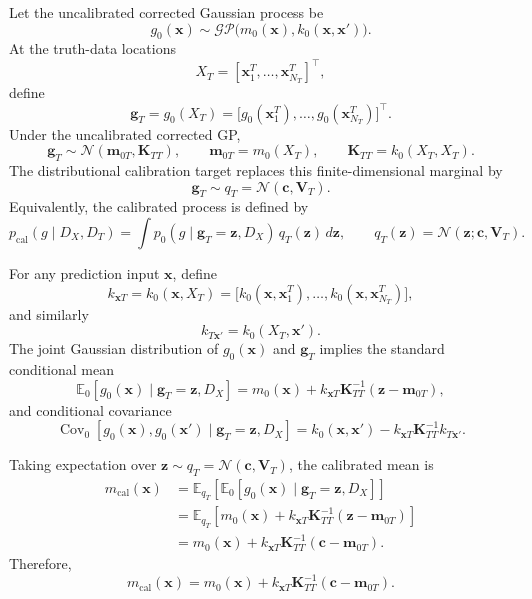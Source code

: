 \documentclass[a4paper,12pt]{article}
\begin{document}
\begin{appendix}
Let the uncalibrated corrected Gaussian process be
\[
g_0(\mathbf{x}) \sim \mathcal{GP}\bigl(m_0(\mathbf{x}),k_0(\mathbf{x},\mathbf{x}')\bigr).
\]
At the truth-data locations
\[
X_T = [\mathbf{x}_1^T,\ldots,\mathbf{x}_{N_T}^T]^\top,
\]
define
\[
\mathbf{g}_T
=
g_0(X_T)
=
\bigl[g_0(\mathbf{x}_1^T),\ldots,g_0(\mathbf{x}_{N_T}^T)\bigr]^\top .
\]
Under the uncalibrated corrected GP,
\[
\mathbf{g}_T \sim \mathcal{N}(\mathbf{m}_{0T},\mathbf{K}_{TT}),
\qquad
\mathbf{m}_{0T}=m_0(X_T),
\qquad
\mathbf{K}_{TT}=k_0(X_T,X_T).
\]
The distributional calibration target replaces this finite-dimensional marginal by
\[
\mathbf{g}_T \sim q_T
=
\mathcal{N}(\mathbf{c},\mathbf{V}_T).
\]
Equivalently, the calibrated process is defined by
\[
p_{\mathrm{cal}}(g\mid D_X,D_T)
=
\int
p_0(g\mid \mathbf{g}_T=\mathbf{z},D_X)\,
q_T(\mathbf{z})\,d\mathbf{z},
\qquad
q_T(\mathbf{z})=\mathcal{N}(\mathbf{z};\mathbf{c},\mathbf{V}_T).
\]

For any prediction input \(\mathbf{x}\), define
\[
k_{\mathbf{x}T}
=
k_0(\mathbf{x},X_T)
=
\bigl[
k_0(\mathbf{x},\mathbf{x}_1^T),
\ldots,
k_0(\mathbf{x},\mathbf{x}_{N_T}^T)
\bigr],
\]
and similarly
\[
k_{T\mathbf{x}'}
=
k_0(X_T,\mathbf{x}').
\]
The joint Gaussian distribution of \(g_0(\mathbf{x})\) and \(\mathbf{g}_T\) implies the
standard conditional mean
\[
\mathbb{E}_0
\left[
g_0(\mathbf{x})
\mid
\mathbf{g}_T=\mathbf{z},D_X
\right]
=
m_0(\mathbf{x})
+
k_{\mathbf{x}T}\mathbf{K}_{TT}^{-1}
(\mathbf{z}-\mathbf{m}_{0T}),
\]
and conditional covariance
\[
\operatorname{Cov}_0
\left[
g_0(\mathbf{x}),g_0(\mathbf{x}')
\mid
\mathbf{g}_T=\mathbf{z},D_X
\right]
=
k_0(\mathbf{x},\mathbf{x}')
-
k_{\mathbf{x}T}\mathbf{K}_{TT}^{-1}k_{T\mathbf{x}'}.
\]

Taking expectation over
\(\mathbf{z}\sim q_T=\mathcal{N}(\mathbf{c},\mathbf{V}_T)\), the calibrated mean is
\[
\begin{aligned}
m_{\mathrm{cal}}(\mathbf{x})
&=
\mathbb{E}_{q_T}
\left[
\mathbb{E}_0
\left[
g_0(\mathbf{x})
\mid
\mathbf{g}_T=\mathbf{z},D_X
\right]
\right] \\
&=
\mathbb{E}_{q_T}
\left[
m_0(\mathbf{x})
+
k_{\mathbf{x}T}\mathbf{K}_{TT}^{-1}
(\mathbf{z}-\mathbf{m}_{0T})
\right] \\
&=
m_0(\mathbf{x})
+
k_{\mathbf{x}T}\mathbf{K}_{TT}^{-1}
(\mathbf{c}-\mathbf{m}_{0T}).
\end{aligned}
\]
Therefore,
\[
\boxed{
m_{\mathrm{cal}}(\mathbf{x})
=
m_0(\mathbf{x})
+
k_{\mathbf{x}T}\mathbf{K}_{TT}^{-1}
(\mathbf{c}-\mathbf{m}_{0T})
}.
\]


\end{appendix}
\end{document}
